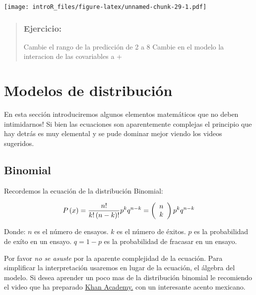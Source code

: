 \documentclass[
]{book}
\begin{document}
\texttt{[image: introR\_files/figure-latex/unnamed-chunk-29-1.pdf]}

\begin{quote}
\hypertarget{ejercicio-5}{%
\subsection{Ejercicio:}\label{ejercicio-5}}

Cambie el rango de la predicción de 2 a 8
Cambie en el modelo la interacion de las covariables a +
\end{quote}

\hypertarget{modelos-de-distribuciuxf3n}{%
\chapter{Modelos de distribución}\label{modelos-de-distribuciuxf3n}}

En esta sección introduciremos algunos elementos matemáticos que no deben intimidarnos! Si bien las ecuaciones son aparentemente complejas el principio que hay detrás es muy elemental y se pude dominar mejor viendo los videos sugeridos.

\hypertarget{binomial}{%
\section{Binomial}\label{binomial}}

Recordemos la ecuación de la distribución Binomial:

\begin{equation} 
  P\left( x \right) = \frac{{n!}}{{k!\left( {n - k} \right)!}}p^k q^{n - k} = \left( {\begin{array}{*{20}c} n \\ k \\ \end{array}} \right)p^k q^{n - k}
  \label{eq:binom}
\end{equation}

Donde:
\(n\) es el número de ensayos.
\(k\) es el número de éxitos.
\(p\) es la probabilidad de exíto en un ensayo.
\(q=1-p\) es la probabilidad de fracasar en un ensayo.

Por favor \emph{no se asuste} por la aparente complejidad de la ecuación. Para simplificar la interpretación usaremos en lugar de la ecuación, el álgebra del modelo. Si desea aprender un poco mas de la distribución binomial le recomiendo el video que ha preparado \href{https://www.youtube.com/watch?v=sRoflgDiCKo}{Khan Academy.} con un interesante acento mexicano.
\end{document}

